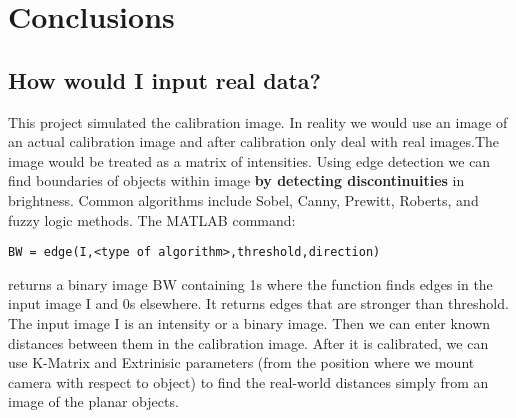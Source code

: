 \documentclass[titlepage]{article}
\begin{document}
\section{Conclusions}
\subsection{How would I input real data?}
This project simulated the calibration image. In reality we would use an image of an actual calibration image and after calibration only deal with real images.The image would be treated as a matrix of intensities. Using edge detection we can find boundaries of objects within image \textbf{by detecting discontinuities} in brightness. Common algorithms include Sobel, Canny, Prewitt, Roberts, and fuzzy logic methods. The MATLAB command:
\begin{verbatim}
BW = edge(I,<type of algorithm>,threshold,direction)
\end{verbatim}
returns a binary image BW containing 1s where the function finds edges in the input image I and 0s elsewhere. It returns edges that are stronger than threshold. The input image I is an intensity or a binary image. Then we can enter known distances between them in the calibration image. After it is calibrated, we can use K-Matrix and Extrinisic parameters (from the position where we mount camera with respect to object) to find the real-world distances simply from an image of the planar objects. 
\end{document}
